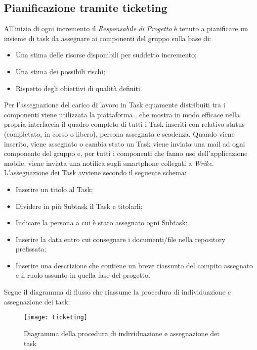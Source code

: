 \documentclass[../NormediProgetto.tex]{subfiles}
\begin{document}
	\subsection{Pianificazione tramite ticketing}
	
	All'inizio di ogni incremento il \textit{Responsabile di Progetto} è tenuto a pianificare un insieme di task da assegnare ai componenti del gruppo sulla base di:
	 
	\begin{itemize}
	 	\item Una stima delle risorse disponibili per suddetto incremento;
	 	\item Una stima dei possibili rischi;
	 	\item Rispetto degli obiettivi di qualità definiti.
	\end{itemize}
	 
	\noindent Per l'assegnazione del carico di lavoro in Task equamente distribuiti tra i componenti viene utilizzata la piattaforma , che mostra in modo efficace nella propria interfaccia il quadro completo di tutti i Task inseriti con relativo status (completato, in corso o libero), persona assegnata e scadenza. Quando viene inserito, viene assegnato o cambia stato un Task viene inviata una mail ad ogni componente del gruppo e, per tutti i componenti che fanno uso dell'applicazione mobile, viene inviata una notifica sugli smartphone collegati a \textit{Wrike}.
	\\ \noindent L'assegnazione dei Task avviene secondo il seguente schema:
	
	\begin{itemize}
		\item Inserire un titolo al Task;
		\item Dividere in più Subtask il Task e titolarli;
		\item Indicare la persona a cui è stato assegnato ogni Subtask;
		\item Inserire la data entro cui consegnare i documenti/file nella repository prefissata;
		\item Inserire una descrizione che contiene un breve riassunto del compito assegnato e il ruolo assunto in quella fase del progetto.
	\end{itemize}
	
	Segue il diagramma di flusso che riassume la procedura di individuazione e assegnazione dei task:
	
	\begin{figure}[H]
		\texttt{[image: ticketing]}
		\centering
		\caption{Diagramma della procedura di individuazione e assegnazione dei task}
	\end{figure}
	
\end{document}
